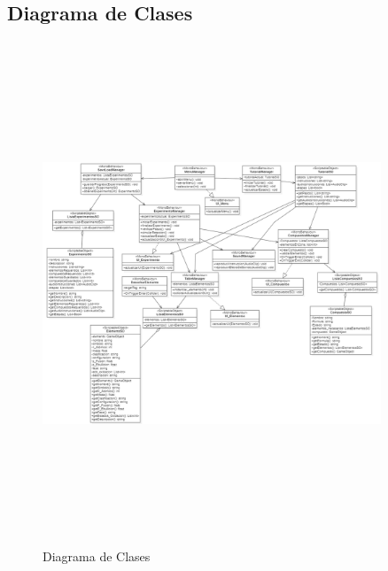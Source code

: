 \subsection{Diagrama de Clases}
\begin{figure}[thbp]
    \centering
    \includegraphics[width=0.9\textwidth, height = 15cm]{img/chapter03/Diagrama de Clases.png}
    \caption{Diagrama de Clases}
    \label{fig:Diagrama_de_Clases}
\end{figure}